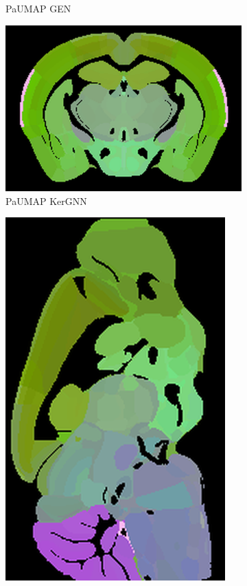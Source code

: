 \documentclass[]{article}
\begin{document}
\begin{figure}
\begin{subfigure}{.176\textwidth}
		\caption{PaUMAP GEN}
		\label{fig:ParaUMAP_GEN_sag}
	\end{subfigure}\hspace{1.3cm}
	\begin{subfigure}{.25\textwidth}
		\centering
		\includegraphics[width=.9\linewidth]{../results/para_umap_KerGNN_ano_coronal_50_res_slice_1.png}
		\caption{PaUMAP KerGNN}
		\label{fig:ParaUMAP_KerGNN_cor}
	\end{subfigure}
	\begin{subfigure}{.176\textwidth}
		\centering
		\includegraphics[width=.9\linewidth, angle=270]{../results/para_umap_KerGNN_ano_sagittal_50_res_slice_1.png}

\end{subfigure}
\end{figure}
\end{document}
